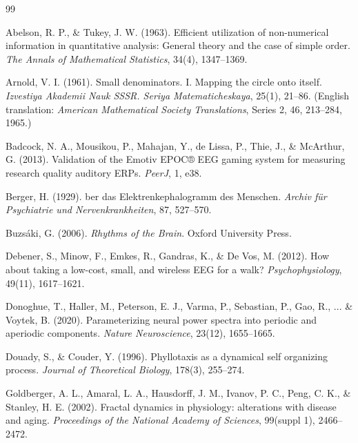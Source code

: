 \documentclass[11pt,a4paper]{article}
\begin{document}
\begin{thebibliography}{99}

Abelson, R. P., \& Tukey, J. W. (1963).
\newblock Efficient utilization of non-numerical information in quantitative analysis: General theory and the case of simple order.
\newblock \textit{The Annals of Mathematical Statistics}, 34(4), 1347--1369.

Arnold, V. I. (1961).
\newblock Small denominators. I. Mapping the circle onto itself.
\newblock \textit{Izvestiya Akademii Nauk SSSR. Seriya Matematicheskaya}, 25(1), 21--86.
\newblock (English translation: \textit{American Mathematical Society Translations}, Series 2, 46, 213--284, 1965.)

Badcock, N. A., Mousikou, P., Mahajan, Y., de Lissa, P., Thie, J., \& McArthur, G. (2013).
\newblock Validation of the Emotiv EPOC® EEG gaming system for measuring research quality auditory ERPs.
\newblock \textit{PeerJ}, 1, e38.

Berger, H. (1929).
ber das Elektrenkephalogramm des Menschen.
\newblock \textit{Archiv f{\"u}r Psychiatrie und Nervenkrankheiten}, 87, 527--570.

Buzs{\'a}ki, G. (2006).
\newblock \textit{Rhythms of the Brain}.
\newblock Oxford University Press.

Debener, S., Minow, F., Emkes, R., Gandras, K., \& De Vos, M. (2012).
\newblock How about taking a low-cost, small, and wireless EEG for a walk?
\newblock \textit{Psychophysiology}, 49(11), 1617--1621.

Donoghue, T., Haller, M., Peterson, E. J., Varma, P., Sebastian, P., Gao, R., ... \& Voytek, B. (2020).
\newblock Parameterizing neural power spectra into periodic and aperiodic components.
\newblock \textit{Nature Neuroscience}, 23(12), 1655--1665.

Douady, S., \& Couder, Y. (1996).
\newblock Phyllotaxis as a dynamical self organizing process.
\newblock \textit{Journal of Theoretical Biology}, 178(3), 255--274.

Goldberger, A. L., Amaral, L. A., Hausdorff, J. M., Ivanov, P. C., Peng, C. K., \& Stanley, H. E. (2002).
\newblock Fractal dynamics in physiology: alterations with disease and aging.
\newblock \textit{Proceedings of the National Academy of Sciences}, 99(suppl 1), 2466--2472.


\end{thebibliography}
\end{document}
